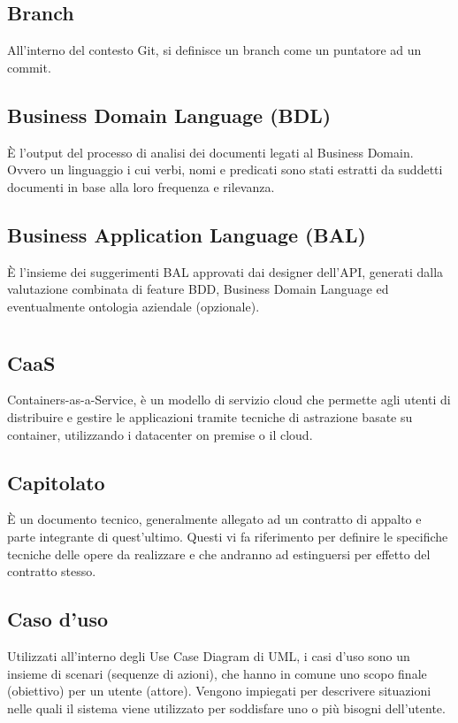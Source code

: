 	\subsection*{Branch}
	All’interno del contesto Git, si definisce un branch come un puntatore ad un commit.
	\subsection*{Business Domain Language (BDL)}
	È l'output del processo di analisi dei documenti legati al Business Domain. Ovvero un linguaggio i cui verbi, nomi e predicati sono stati estratti da suddetti documenti in base alla loro frequenza e rilevanza.
	\subsection*{Business Application Language (BAL)}
	È l’insieme dei suggerimenti BAL approvati dai designer dell’API, generati dalla valutazione combinata di feature BDD, Business Domain Language ed eventualmente ontologia aziendale (opzionale).
\pagebreak
\section{}
	\subsection*{CaaS}
	Containers-as-a-Service, è un modello di servizio cloud che permette agli utenti di distribuire e gestire le applicazioni tramite tecniche di astrazione basate su container, utilizzando i datacenter on premise o il cloud.
	\subsection*{Capitolato}
	È un documento tecnico, generalmente allegato ad un contratto di appalto e parte integrante di quest’ultimo. Questi vi fa riferimento per definire le specifiche tecniche delle opere da realizzare e che andranno ad estinguersi per effetto del contratto stesso.
	\subsection*{Caso d'uso}
	Utilizzati all’interno degli Use Case Diagram di UML, i casi d’uso sono un insieme di scenari (sequenze di azioni), che hanno in comune uno scopo finale (obiettivo) per un utente (attore). Vengono impiegati per descrivere situazioni nelle quali il sistema viene utilizzato per soddisfare uno o più bisogni dell’utente.
